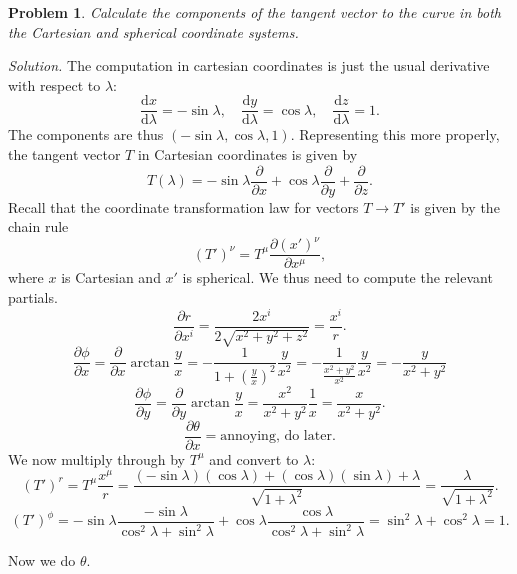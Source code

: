 \documentclass[11pt, letterpaper]{article}
\theoremstyle{plain}
\newtheorem{problem}{Problem}[section]
\begin{document}
\begin{problem}
	Calculate the components of the tangent vector to the curve in both the Cartesian and spherical coordinate systems.
\end{problem}
\noindent\emph{Solution.} The computation in cartesian coordinates is just the usual derivative with respect to $\lambda $:
\[
	\frac{\mathrm{d}x}{\mathrm{d}\lambda }=-\sin \lambda ,\quad \frac{\mathrm{d}y}{\mathrm{d}\lambda } =\cos \lambda ,\quad \frac{\mathrm{d}z}{\mathrm{d}\lambda } =1
.\]
The components are thus $(-\sin \lambda ,\cos \lambda ,1)$. Representing this more properly, the tangent vector $T$ in Cartesian coordinates is given by
\[
	T(\lambda )=-\sin \lambda \frac{\partial }{\partial x} +\cos \lambda \frac{\partial }{\partial y} +\frac{\partial }{\partial z} 
.\]
Recall that the coordinate transformation law for vectors $T\to T'$ is given by the chain rule
\[
	(T')^\nu =T^\mu \frac{\partial (x')^\nu }{\partial x^\mu } ,
\]
where $x$ is Cartesian and $x'$ is spherical. We thus need to compute the relevant partials.
\[
	\frac{\partial r}{\partial x^i} =\frac{2x^i}{2\sqrt{x^2+y^2+z^2} } =\frac{x^i}{r} 
.\]
\[
	\frac{\partial \phi}{\partial x} =\frac{\partial }{\partial x} \arctan \frac{y}{x} =-\frac{1}{1+\left( \frac{y}{x}  \right) ^2} \frac{y}{x^2} =-\frac{1}{\frac{x^2+y^2}{x^2} }\frac{y}{x^2} =-\frac{y}{x^2+y^2} 
\]
\[
	\frac{\partial \phi }{\partial y} =\frac{\partial }{\partial y} \arctan \frac{y}{x} =\frac{x^2}{x^2+y^2} \frac{1}{x} =\frac{x}{x^2+y^2} 
.\]
\[
	\frac{\partial \theta }{\partial x} =\text{annoying, do later} 
.\]
We now multiply through by $T^\mu $ and convert to $\lambda $:
\[
	(T')^r=T^\mu \frac{x^\mu }{r} =\frac{(-\sin \lambda )(\cos \lambda )+(\cos \lambda )(\sin \lambda )+\lambda }{\sqrt{1+\lambda ^2} } =\frac{\lambda }{\sqrt{1+\lambda ^2} } 
.\]
\[
	(T')^\phi = -\sin \lambda \frac{-\sin \lambda }{\cos ^2\lambda +\sin ^2\lambda } +\cos \lambda \frac{\cos \lambda }{\cos ^2\lambda +\sin ^2\lambda } =\sin ^2\lambda +\cos ^2\lambda =1
.\]

Now we do $\theta $.
\end{document}
